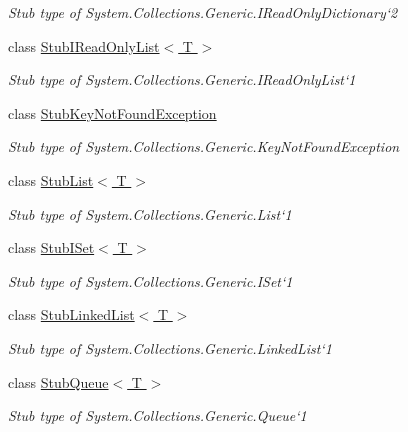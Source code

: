 \begin{DoxyCompactItemize}
\begin{DoxyCompactList}\small\item\em Stub type of System.\-Collections.\-Generic.\-I\-Read\-Only\-Dictionary`2\end{DoxyCompactList}\item 
class \hyperlink{class_system_1_1_collections_1_1_generic_1_1_fakes_1_1_stub_i_read_only_list_3_01_t_01_4}{Stub\-I\-Read\-Only\-List$<$ T $>$}
\begin{DoxyCompactList}\small\item\em Stub type of System.\-Collections.\-Generic.\-I\-Read\-Only\-List`1\end{DoxyCompactList}\item 
class \hyperlink{class_system_1_1_collections_1_1_generic_1_1_fakes_1_1_stub_key_not_found_exception}{Stub\-Key\-Not\-Found\-Exception}
\begin{DoxyCompactList}\small\item\em Stub type of System.\-Collections.\-Generic.\-Key\-Not\-Found\-Exception\end{DoxyCompactList}\item 
class \hyperlink{class_system_1_1_collections_1_1_generic_1_1_fakes_1_1_stub_list_3_01_t_01_4}{Stub\-List$<$ T $>$}
\begin{DoxyCompactList}\small\item\em Stub type of System.\-Collections.\-Generic.\-List`1\end{DoxyCompactList}\item 
class \hyperlink{class_system_1_1_collections_1_1_generic_1_1_fakes_1_1_stub_i_set_3_01_t_01_4}{Stub\-I\-Set$<$ T $>$}
\begin{DoxyCompactList}\small\item\em Stub type of System.\-Collections.\-Generic.\-I\-Set`1\end{DoxyCompactList}\item 
class \hyperlink{class_system_1_1_collections_1_1_generic_1_1_fakes_1_1_stub_linked_list_3_01_t_01_4}{Stub\-Linked\-List$<$ T $>$}
\begin{DoxyCompactList}\small\item\em Stub type of System.\-Collections.\-Generic.\-Linked\-List`1\end{DoxyCompactList}\item 
class \hyperlink{class_system_1_1_collections_1_1_generic_1_1_fakes_1_1_stub_queue_3_01_t_01_4}{Stub\-Queue$<$ T $>$}
\begin{DoxyCompactList}\small\item\em Stub type of System.\-Collections.\-Generic.\-Queue`1\end{DoxyCompactList}\item 

\end{DoxyCompactItemize}
